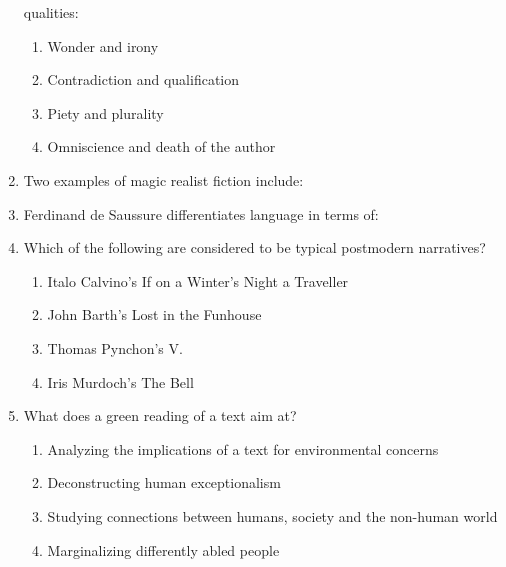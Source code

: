 \documentclass[12pt]{article}
\theoremstyle{remark}
\begin{document}
\begin{enumerate}
qualities: 
\begin{enumerate} 
\item Wonder and irony 
\item Contradiction and qualification 
\item Piety and plurality 
\item Omniscience and death of the author 
\end{enumerate}
\hfill{}
\item Two examples of magic realist fiction include: 
\begin{enumerate}  \end{enumerate}
\hfill{}
\item Ferdinand de Saussure differentiates language in terms of: 
\begin{enumerate}  \end{enumerate}
\hfill{}
\item Which of the following are considered to be typical postmodern narratives? 
\begin{enumerate} 
\item Italo Calvino's If on a Winter's Night a Traveller 
\item John Barth's Lost in the Funhouse 
\item Thomas Pynchon's V. 
\item Iris Murdoch's The Bell 
\end{enumerate}
\hfill{}
\item What does a green reading of a text aim at? 
\begin{enumerate} 
\item Analyzing the implications of a text for environmental concerns 
\item Deconstructing human exceptionalism 
\item Studying connections between humans, society and the non-human world 
\item Marginalizing differently abled people 
\end{enumerate}
\hfill{}
\end{enumerate}
\end{document}

